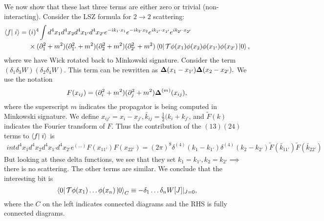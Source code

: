 We now show that these last three terms are either zero or trivial (non-interacting). Consider the LSZ formula for $2\to 2$ scattering:
\begin{align*}
    \braket{f}{i}={}&(i)^4 \int d^4 x_1 d^4 x_2 d^4x_{1'} d^4x_{2'} e^{-ik_1\cdot x_1} e^{-ik_2 \cdot x_2} e^{ik_{1'}\cdot x_{1'}} e^{ik_{2'} \cdot x_{2'}}\\
        &\times (\p_1^2 +m^2)(\p_{1'}^2+m^2)(\p_2^2+m^2)(\p_{2'}^2 +m^2)
        \bra{0}\mathcal{T} \phi(x_1)\phi(x_2)\phi(x_{1'})\phi(x_{2'})\ket{0},
\end{align*}
where we have Wick rotated back to Minkowski signature. Consider the term $(\delta_1\delta_3W)(\delta_2\delta_4W)$. This term can be rewritten as $\mbox{\boldmath$ \Delta $}(x_1-x_{1'})\mbox{\boldmath$ \Delta $}(x_2-x_{2'}).$ We use the notation 
\begin{equation*}
    F(x_{ij})=(\partial_i^2 +m^2)(\partial_j^2 +m^2)\mbox{\boldmath$ \Delta $}^{(m)}(x_{ij}),
\end{equation*} 
where the superscript $m$ indicates the propagator is being computed in Minkowski signature. We define $x_{ij'}=x_i-x_{j'}, \bar k_{ij}=\frac{1}{2}(k_i +k_{j'}$, and $\tilde F(k)$ indicates the Fourier transform of $F$. Thus the contribution of the $(13)(24)$ terms to $\braket{f}{i}$ is
\begin{align*}
    int d^4 x_1 d^4 x_2 d^4x_{1'} d^4x_{2'} e^{(\ldots)} F(x_{11'}) F(x_{22'}) = (2\pi)^8 \delta^{(4)}(k_1 -k_{1'})\delta^{(4)} (k_2-k_{2'}) \tilde F (\bar k_{11'}) \tilde F(\bar k_{22'})
\end{align*}
But looking at these delta functions, we see that they set $k_1=k_{1'},k_2=k_{2'}\implies$ there is no scattering. The other terms are similar. We conclude that the interesting bit is
\begin{equation}
    \left< 0 \right|\mathcal{T}\phi(x_1)\ldots \phi(x_n) \left| 0 \right>_C \equiv -\delta_1 \ldots \delta_n W[J]|_{J=0},
\end{equation}
where the $C$ on the left indicates connected diagrams and the RHS is fully connected diagrams.